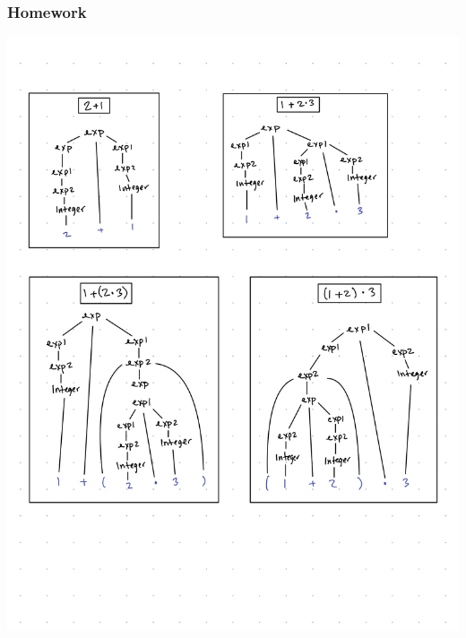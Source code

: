 \documentclass{article}
\theoremstyle{theorem}
\theoremstyle{definition}
\theoremstyle{remark}
\begin{document}
\subsubsection*{Homework}
\begin{center}
\includegraphics[scale=.5]{CPSC354 HW4-1.png}

\end{center}
\end{document}
